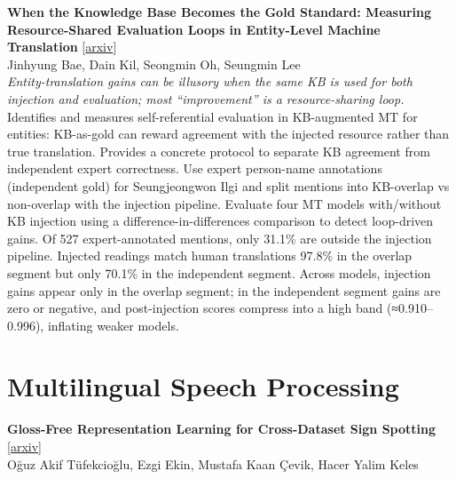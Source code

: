 \documentclass[12pt,letterpaper]{article}
\begin{document}
\medskip

{\small\textbf{When the Knowledge Base Becomes the Gold Standard: Measuring Resource-Shared Evaluation Loops in Entity-Level Machine Translation}} {\scriptsize[\href{https://arxiv.org/abs/2608.11843}{arxiv}]}\\
{\scriptsize Jinhyung Bae, Dain Kil, Seongmin Oh, Seungmin Lee}\\

{\small\textit{Entity-translation gains can be illusory when the same KB is used for both injection and evaluation; most ``improvement'' is a resource-sharing loop.}}\\[1pt]
{\footnotesize Identifies and measures self-referential evaluation in KB-augmented MT for entities: KB-as-gold can reward agreement with the injected resource rather than true translation. Provides a concrete protocol to separate KB agreement from independent expert correctness. Use expert person-name annotations (independent gold) for Seungjeongwon Ilgi and split mentions into KB-overlap vs non-overlap with the injection pipeline. Evaluate four MT models with/without KB injection using a difference-in-differences comparison to detect loop-driven gains. Of 527 expert-annotated mentions, only 31.1\% are outside the injection pipeline. Injected readings match human translations 97.8\% in the overlap segment but only 70.1\% in the independent segment. Across models, injection gains appear only in the overlap segment; in the independent segment gains are zero or negative, and post-injection scores compress into a high band (≈0.910--0.996), inflating weaker models.}

\medskip


\section*{Multilingual Speech Processing}

{\small\textbf{Gloss-Free Representation Learning for Cross-Dataset Sign Spotting}} {\scriptsize[\href{https://arxiv.org/abs/2608.11332}{arxiv}]}\\
{\scriptsize O\u{g}uz Akif T\"ufekcio\u{g}lu, Ezgi Ekin, Mustafa Kaan \c{C}evik, Hacer Yalim Keles}\\
\end{document}
